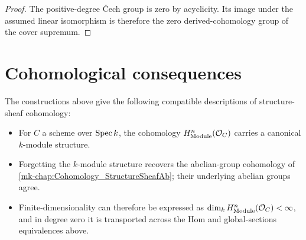 \begin{proof}
  \leanok
  The positive-degree \v{C}ech group is zero by acyclicity. Its image under the assumed linear isomorphism is therefore the zero derived-cohomology group of the cover supremum.
\end{proof}

\section{Cohomological consequences}

The constructions above give the following compatible descriptions of structure-sheaf cohomology:

\begin{itemize}
  \item For \(C\) a scheme over \(\operatorname{Spec} k\), the cohomology \(H^n_{\mathrm{Module}}(\mathcal O_C)\) carries a canonical \(k\)-module structure.
  \item Forgetting the \(k\)-module structure recovers the abelian-group cohomology of \ref{mk-chap:Cohomology_StructureSheafAb}; their underlying abelian groups agree.
  \item Finite-dimensionality can therefore be expressed as \(\dim_k H^n_{\mathrm{Module}}(\mathcal O_C)<\infty\), and in degree zero it is transported across the Hom and global-sections equivalences above.
\end{itemize}
